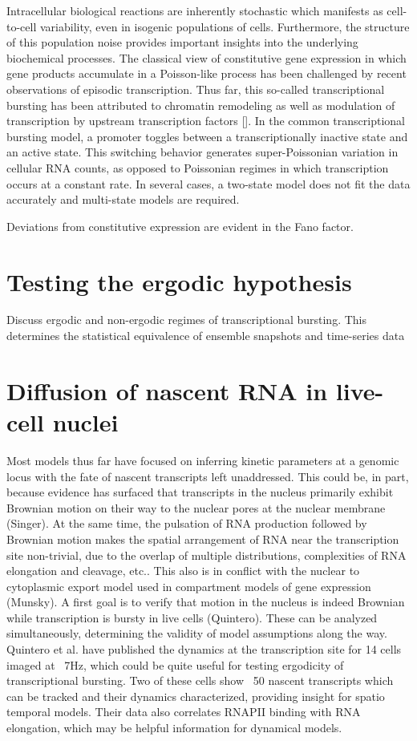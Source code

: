 \documentclass{article}
\begin{document}
Intracellular biological reactions are inherently stochastic which manifests as cell-to-cell variability, even in isogenic populations of cells. Furthermore, 
the structure of this population noise provides important insights into the underlying biochemical processes. The classical view of constitutive gene expression in which gene products accumulate in a Poisson-like process has been challenged by recent observations of episodic transcription. Thus far, this so-called transcriptional bursting has been attributed to chromatin remodeling as well as modulation of transcription by upstream transcription factors []. In the common transcriptional bursting model, a promoter toggles between a transcriptionally inactive state and an active state. This switching behavior generates super-Poissonian variation in cellular RNA counts, as opposed to Poissonian regimes in which transcription occurs at a constant rate. In several cases, a two-state model does not fit the data accurately and multi-state models are required. 

Deviations from constitutive expression are evident in the Fano factor. 

\section{Testing the ergodic hypothesis}

Discuss ergodic and non-ergodic regimes of transcriptional bursting. This determines the statistical equivalence of ensemble snapshots and time-series data

\section{Diffusion of nascent RNA in live-cell nuclei}

Most models thus far have focused on inferring kinetic parameters at a genomic locus with the fate of nascent transcripts left unaddressed. This could be, in part, because evidence has surfaced that transcripts in the nucleus primarily exhibit Brownian motion on their way to the nuclear pores at the nuclear membrane (Singer). At the same time, the pulsation of RNA production followed by Brownian motion makes the spatial arrangement of RNA near the transcription site non-trivial, due to the overlap of multiple distributions, complexities of RNA elongation and cleavage, etc.. This also is in conflict with the nuclear to cytoplasmic export model used in compartment models of gene expression (Munsky). A first goal is to verify that motion in the nucleus is indeed Brownian while transcription is bursty in live cells (Quintero). These can be analyzed simultaneously, determining the validity of model assumptions along the way. Quintero et al. have published the dynamics at the transcription site for 14 cells imaged at ~7Hz, which could be quite useful for testing ergodicity of transcriptional bursting. Two of these cells show ~50 nascent transcripts which can be tracked and their dynamics characterized, providing insight for spatio temporal models. Their data also correlates RNAPII binding with RNA elongation, which may be helpful information for dynamical models.
\end{document}
